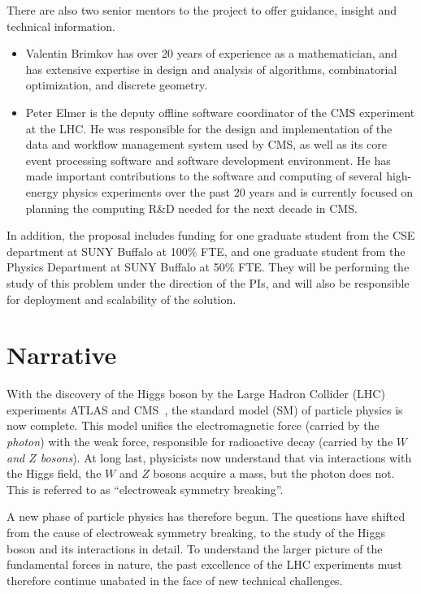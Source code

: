 \documentclass[12pt]{article}
\begin{document}
There are also two senior mentors to the project to offer guidance,
insight and technical information. 
\begin{itemize}
\item Valentin Brimkov has over 20 years of experience as a
  mathematician, and has extensive expertise
  in design and analysis of algorithms, combinatorial optimization,
  and discrete geometry. 
\item Peter Elmer is the deputy offline software coordinator of the CMS
experiment at the LHC. He was responsible for the design and implementation
of the data and workflow management system used by CMS, as well as its core
event processing software and software development environment. He has
made important contributions to the software and computing of several 
high-energy physics experiments over the past 20 years and is currently
focused on planning the computing R\&D needed for the next decade in CMS.

\end{itemize}

In addition, the proposal includes funding for
one graduate student from the CSE department at SUNY Buffalo at 100\%
FTE, and one graduate student from the Physics Department at SUNY
Buffalo at 50\% FTE. They will be performing the study of this problem
under the direction of the PIs, and will also be responsible for
deployment and scalability of the solution. 

\clearpage

\section{Narrative}

With the discovery of the Higgs boson 
by the Large Hadron Collider (LHC)
experiments ATLAS and CMS~\cite{higgs_cms,higgs_atlas}, the
standard model (SM) of particle
physics is now complete. This model unifies the electromagnetic force
(carried by the {\em photon}) with the weak force, responsible for
radioactive decay (carried by the {\em $W$ and $Z$ bosons}).
At long last,
physicists now understand that via interactions with the Higgs field,
the $W$ and $Z$ bosons acquire a mass, but the photon does not. 
This is referred to as ``electroweak symmetry breaking''. 


A new phase of particle physics has therefore begun. 
The questions have shifted from the cause of electroweak symmetry
breaking, to the study of the Higgs boson and its interactions in
detail. 
To understand the larger picture of the fundamental forces in nature,
the past excellence of the LHC experiments must therefore continue
unabated in the face of new technical challenges. 
\end{document}
